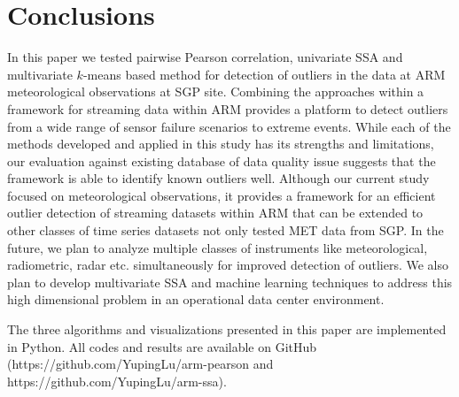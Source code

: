 \section{Conclusions}
In this paper we tested pairwise Pearson correlation,
univariate SSA and multivariate $k$-means based method for detection of
outliers in the data at ARM meteorological observations at SGP site. 
Combining the approaches within a framework for
streaming data within ARM provides a platform to detect outliers
from a wide range of sensor failure scenarios to extreme events.
While each of the methods developed and applied in this study has its
strengths and limitations, our evaluation against existing database of
data quality issue suggests that the framework is able to identify known
outliers well. Although our current study focused on
meteorological observations, it provides a framework for an efficient
outlier detection of streaming datasets within ARM that can be extended to
other classes of time series datasets not only tested MET data from SGP. 
In the future, we plan to analyze multiple
classes of instruments like meteorological, radiometric, radar etc.
simultaneously for improved detection of outliers. We also plan to
develop multivariate SSA \cite{rodrigues2018benefits} and machine learning 
techniques to address this high dimensional problem in an operational 
data center environment.

The three algorithms and visualizations presented in this paper are 
implemented in Python. All codes and results are available on GitHub 
(https://github.com/YupingLu/arm-pearson and https://github.com/YupingLu/arm-ssa). 
